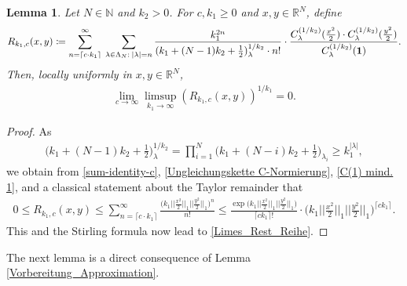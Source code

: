 \documentclass[reqno]{amsart}
\theoremstyle{plain}
\newtheorem{lemma}[theorem]{Lemma}
\theoremstyle{definition}
\numberwithin{equation}{section}
\newcommand{\R}{\mathbb{R}}
\newcommand{\N}{\mathbb{N}}
\begin{document}
\begin{lemma}\label{Kontrolle_Reihenrest}
Let $N\in\N$ and $k_2>0$.
For $c,k_1 \geq 0$ and $x,y \in \R^N$, define 
\begin{align}
R_{k_1,c}(x,y) \coloneqq \sum\limits_{n=\lceil c \cdot k_1 \rceil}^{\infty}\>  \sum\limits_{\lambda \in \Lambda_N :\> |\lambda|=n}
\frac
{k_1^{2n}}{(k_1+(N-1)k_2+\frac{1}{2})_{\lambda}^{1/k_2} \cdot n!} 
\cdot 
\frac{C_{\lambda}^{(1/k_2)}(\frac{x^2}{2}) \cdot C_{\lambda}^{(1/k_2)}(\frac{y^2}{2})}
{C_{\lambda}^{(1/k_2)}({\bf 1})}. \nonumber
\end{align}
Then, locally uniformly in $x,y\in\R^N$,
\begin{align}
\lim\limits_{c \to \infty} \limsup\limits_{k_1 \to \infty} (R_{k_1,c}(x,y))^{1/k_1}=0. \label{Limes_Rest_Reihe}
\end{align}
\end{lemma}

\begin{proof}
As
\begin{align*}
\Big( k_1+(N-1)k_2+\frac{1}{2} \Big)_{\lambda}^{1/k_2}
=
\prod\limits_{i=1}^N \Big( k_1+(N-i)k_2+\frac{1}{2} \Big)_{\lambda_i} \geq k_1^{|\lambda|},
\end{align*}
we obtain from \eqref{sum-identity-c}, \eqref{Ungleichungskette C-Normierung}, \eqref{C(1) mind. 1}, and a classical statement about the Taylor remainder that
\begin{align}
0
\leq
R_{k_1,c}(x,y) 
\leq 
\sum\limits_{n=\lceil c \cdot k_1 \rceil}^{\infty} \frac{\big(k_1 \big| \big| \frac{x^2}{2} \big| \big|_1 \big| \big| \frac{y^2}{2} \big| \big|_1\big)^n}{n!}
\leq
\frac{\exp\big(k_1 \big| \big| \frac{x^2}{2} \big| \big|_1 \big| \big| \frac{y^2}{2} \big| \big|_1\big)}{\lceil c k_1 \rceil !} 
\cdot \Big(k_1 \big| \big| \frac{x^2}{2} \big| \big|_1 \big| \big| \frac{y^2}{2} \big| \big|_1\Big)^{\lceil c k_1 \rceil}. \label{Abschaetzung_Rest_Reihe}
\end{align}
This and the Stirling formula now lead to 
\eqref{Limes_Rest_Reihe}.
\end{proof}



The next lemma is a direct consequence of Lemma \ref{Vorbereitung_Approximation}.
\end{document}
